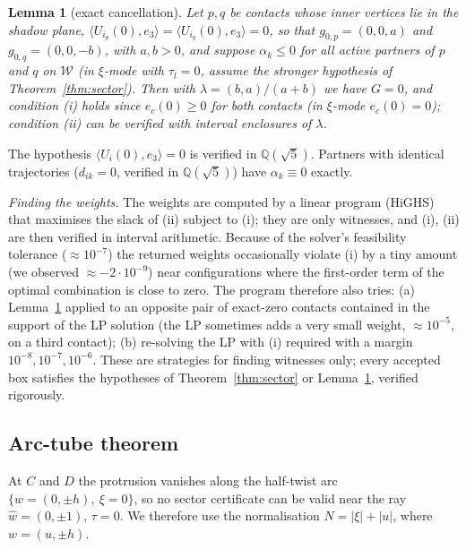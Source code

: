 \documentclass[11pt]{amsart}
\newtheorem{lemma}[theorem]{Lemma}
\theoremstyle{definition}
\newcommand{\Q}{\mathbb{Q}}
\newcommand{\sq}{\sqrt5}
\newcommand{\ip}[2]{\langle #1,#2\rangle}
\newcommand{\abs}[1]{\lvert #1\rvert}
\begin{document}
\begin{lemma}[exact cancellation]\label{lem:zero}
Let $p,q$ be contacts whose inner vertices lie in the shadow plane, $\ip{U_{i_p}(0)}{e_3}=\ip{U_{i_q}(0)}{e_3}=0$, so that
$g_{0,p}=(0,0,a)$ and $g_{0,q}=(0,0,-b)$, with $a,b>0$, and suppose $\alpha_k\le0$ for all active partners of $p$ and $q$
on $\mathcal W$ (in $\xi$-mode with $\tau_l=0$, assume the stronger hypothesis of Theorem~\ref{thm:sector}). Then with
$\lambda=(b,a)/(a+b)$ we have $G=0$, and condition (i) holds since $e_c(0)\ge0$ for both contacts (in $\xi$-mode
$e_c(0)=0$); condition (ii) can be verified with interval enclosures of $\lambda$.
\end{lemma}
\noindent The hypothesis $\ip{U_i(0)}{e_3}=0$ is verified in $\Q(\sq)$. Partners with identical trajectories
($d_{ik}=0$, verified in $\Q(\sq)$) have $\alpha_k\equiv0$ exactly.

\noindent\emph{Finding the weights.} The weights are computed by a linear program (HiGHS) that maximises the slack of (ii)
subject to (i); they are only witnesses, and (i), (ii) are then verified in interval arithmetic. Because of the solver's
feasibility tolerance ($\approx10^{-7}$) the returned weights occasionally violate (i) by a tiny amount (we observed
$\approx-2\cdot10^{-9}$) near configurations where the first-order term of the optimal combination is close to zero.
The program therefore also tries: (a) Lemma~\ref{lem:zero} applied to an opposite pair of exact-zero contacts contained
in the support of the LP solution (the LP sometimes adds a very small weight, $\approx10^{-5}$, on a third contact);
(b) re-solving the LP with (i) required with a margin $10^{-8},10^{-7},10^{-6}$. These are strategies for finding
witnesses only; every accepted box satisfies the hypotheses of Theorem~\ref{thm:sector} or Lemma~\ref{lem:zero},
verified rigorously.

\subsection{Arc-tube theorem}
At $C$ and $D$ the protrusion vanishes along the half-twist arc $\{w=(0,\pm h),\ \xi=0\}$, so no sector certificate can be
valid near the ray $\hat w=(0,\pm1)$, $\tau=0$. We therefore use the normalisation $N=\abs\xi+\abs u$, where $w=(u,\pm h)$.
\end{document}
